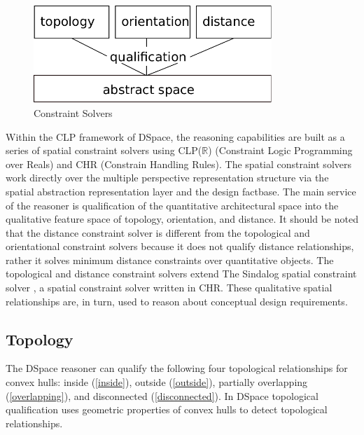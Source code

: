 \documentclass[12pt]{ucthesis}
\begin{document}
\begin{figure}[H]
\centering
\includegraphics[width=90mm]{reasoner-design}
\caption{Constraint Solvers}
\label{reasoner-design}
\end{figure}

Within the CLP framework of DSpace, the reasoning capabilities are built as a series of spatial constraint solvers using CLP($\mathbb{R}$) (Constraint Logic Programming over Reals) and CHR (Constrain Handling Rules). The spatial constraint solvers work directly over the multiple perspective representation structure via the spatial abstraction representation layer and the design factbase. The main service of the reasoner is qualification of the quantitative architectural space into the qualitative feature space of topology, orientation, and distance. It should be noted that the distance constraint solver is different from the topological and orientational constraint solvers because it does not qualify distance relationships, rather it solves minimum distance constraints over quantitative objects. The topological and distance constraint solvers extend The Sindalog spatial constraint solver \cite{Sindalong}, a spatial constraint solver written in CHR. These qualitative spatial relationships are, in turn, used to reason about conceptual design requirements.

\subsection{Topology}
The DSpace reasoner can qualify the following four topological relationships for convex hulls: inside (\ref{inside}), outside (\ref{outside}), partially overlapping (\ref{overlapping}), and disconnected (\ref{disconnected}). In DSpace topological qualification uses geometric properties of convex hulls to detect topological relationships. 
\end{document}
